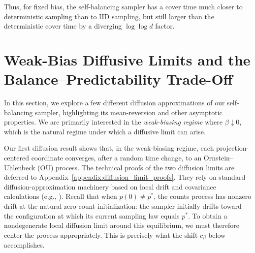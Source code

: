 \noindent Thus, for fixed bias, the self-balancing sampler has a cover time much closer to deterministic sampling than to IID sampling, but still larger than the deterministic cover time by a diverging $\log \log d$ factor.


\section{Weak-Bias Diffusive Limits and the Balance--Predictability Trade-Off}
\label{sec:diffusion_approximations}

In this section, we explore a few different diffusion approximations of our self-balancing sampler, highlighting its mean-reversion and other asymptotic properties. We are primarily interested in the \textit{weak-biasing regime} where $\beta \downarrow 0$, which is the natural regime under which a diffusive limit can arise.


Our first diffusion result shows that, in the weak-biasing regime, each projection-centered coordinate
converges, after a random time change, to an Ornstein--Uhlenbeck (OU) process. The technical proofs of
the two diffusion limits are deferred to Appendix~\ref{appendix:diffusion_limit_proofs}. They rely on
standard diffusion-approximation machinery based on local drift and covariance calculations
(e.g., \cite[Section~8.7]{durrett1996_stochastic_calculus_practical_introduction}). Recall that when
$p(0) \neq p^*$, the counts process has nonzero drift at the natural zero-count initialization: the
sampler initially drifts toward the configuration at which its current sampling law equals $p^*$.
To obtain a nondegenerate local diffusion limit around this equilibrium, we must therefore center the
process appropriately. This is precisely what the shift $c_\beta$ below accomplishes.


